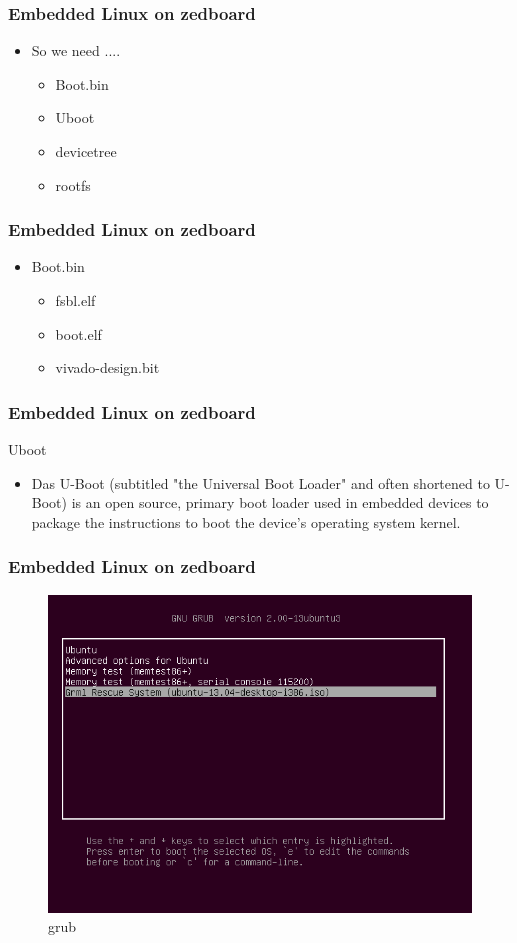 \documentclass{beamer}
\begin{document}
\begin{frame}
\frametitle{Embedded Linux on zedboard}
\begin{itemize}
\item So we need ....
	\begin{itemize}
	\item Boot.bin
	\item Uboot
	\item devicetree
	\item rootfs
	\end{itemize}
\end{itemize}
\end{frame}

\begin{frame}
\frametitle{Embedded Linux on zedboard}
\begin{itemize}
\item Boot.bin
	\begin{itemize}
	\item fsbl.elf
	\item boot.elf
	\item vivado-design.bit
	\end{itemize}
\end{itemize}
\end{frame}

\begin{frame}
\frametitle{Embedded Linux on zedboard}
\centering Uboot
\centering \\
\begin{itemize}
	\item Das U-Boot (subtitled "the Universal Boot Loader" and often shortened to U-Boot) is an open source, primary boot loader used in embedded devices to package the instructions to boot the device's operating system kernel.
\end{itemize}
\end{frame}


\begin{frame}
\frametitle{Embedded Linux on zedboard}
\begin{figure}
\centering\includegraphics[scale=0.35]{grub.png}
\caption{grub}
\end{figure}
\end{frame}
\end{document}
